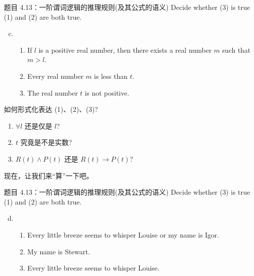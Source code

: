 \begin{frame}{}
  \begin{exampleblock}{题目 4.13：一阶谓词逻辑的推理规则(及其公式的语义)}
    Decide whether (3) is true  (1) and (2) are both true.

    \begin{enumerate}[(a)]
      \setcounter{enumi}{2}
      \item 
	\begin{enumerate}[(1)]
	  \item If $l$ is a positive real number, then there exists a real number $m$ such that $m > l$.
	  \item Every real number $m$ is less than $t$.
	  \item The real number $t$ is not positive.
	\end{enumerate}
    \end{enumerate}
  \end{exampleblock}

  \vspace{0.30cm}
  \pause
  如何形式化表达 (1)、(2)、(3)?
  \begin{enumerate}[(1)]
    \pause
    \item $\forall l$ 还是仅是 $l$?
    \pause
    \item $t$ 究竟是不是实数?
    \pause
    \item $R(t) \land P(t)$ 还是 $R(t) \to P(t)$?
  \end{enumerate}

  \pause
  \vspace{0.30cm}
  \centerline{现在，让我们来``算''一下吧。}
\end{frame}

\begin{frame}{}
  \begin{exampleblock}{题目 4.13：一阶谓词逻辑的推理规则(及其公式的语义)}
    Decide whether (3) is true  (1) and (2) are both true.

    \begin{enumerate}[(a)]
      \setcounter{enumi}{3}
      \item 
	\begin{enumerate}[(1)]
	  \item Every little breeze seems to whisper Louise or my name is Igor.
	  \item My name is Stewart.
	  \item Every little breeze seems to whisper Louise.
	\end{enumerate}
    \end{enumerate}
  \end{exampleblock}
\end{frame}

